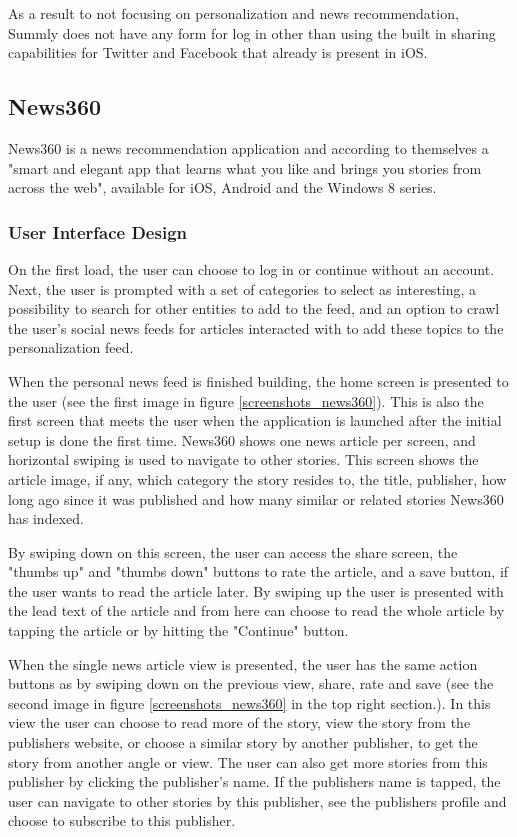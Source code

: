 As a result to not focusing on personalization and news recommendation, Summly does not have any form for log in other than using the built in sharing capabilities for Twitter and Facebook that already is present in iOS.

\subsection{News360}

News360 is a news recommendation application and according to themselves a "smart and elegant app that learns what you like and brings you stories from across the web"\cite{news360_about}, available for iOS, Android and the Windows 8 series.

\subsubsection{User Interface Design}
On the first load, the user can choose to log in or continue without an account. Next, the user is prompted with a set of categories to select as interesting, a possibility to search for other entities to add to the feed, and an option to crawl the user's social news feeds for articles interacted with to add these topics to the personalization feed.

When the personal news feed is finished building, the home screen is presented to the user (see the first image in figure \ref{screenshots_news360}). This is also the first screen that meets the user when the application is launched after the initial setup is done the first time. News360 shows one news article per screen, and horizontal swiping is used to navigate to other stories. This screen shows the article image, if any, which category the story resides to, the title, publisher, how long ago since it was published and how many similar or related stories News360 has indexed.

By swiping down on this screen, the user can access the share screen, the "thumbs up" and "thumbs down" buttons to rate the article, and a save button, if the user wants to read the article later. By swiping up the user is presented with the lead text of the article and from here can choose to read the whole article by tapping the article or by hitting the "Continue" button.

When the single news article view is presented, the user has the same action buttons as by swiping down on the previous view, share, rate and save (see the second image in figure \ref{screenshots_news360} in the top right section.). In this view the user can choose to read more of the story, view the story from the publishers website, or choose a similar story by another publisher, to get the story from another angle or view. The user can also get more stories from this publisher by clicking the publisher's name. If the publishers name is tapped, the user can navigate to other stories by this publisher, see the publishers profile and choose to subscribe to this publisher.

